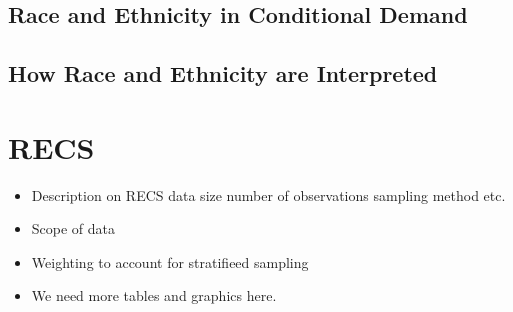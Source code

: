 \documentclass{article}
\begin{document}
\cite{RBase}




  \subsection{Race and Ethnicity in Conditional Demand}
  
  \subsection{How Race and Ethnicity are Interpreted}

\section{RECS}

\begin{itemize}
  \item Description on RECS data size number of observations sampling method etc.
  \item Scope of data  
  \item Weighting to account for stratifieed sampling
  \item We need more tables and graphics here.
\end{itemize}
\end{document}
